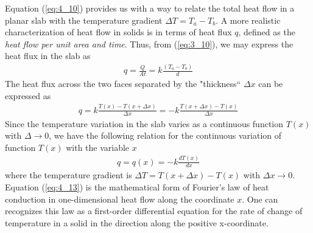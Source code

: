 \documentclass[11pt]{report}
\newcommand{\refn}[1]{(\ref{#1})}
\newcommand{\refx}[1]{\refn{eq:#1}}
\begin{document}
	Equation \refx{4_10} provides us with a way to relate the total heat flow in a planar slab with the temperature gradient $\Delta T = T_a - T_b$. A more realistic characterization of heat flow in solids is in terms of heat flux $q$, defined as the \textit{heat flow per unit area and time}. Thus, from \refx{3_10}, we may express the heat flux in the slab as
	\begin{eqnarray}
		q = \frac{Q}{At} = k\frac{(T_a - T_b)}{d}\label{eq:4_11}
	\end{eqnarray}
	The heat flux across the two faces separated by the "thickness`` $\Delta x $ can be expressed as
	\begin{eqnarray}
		q = k\frac{T(x) - T(x + \Delta x)}{\Delta x} = -k\frac{T(x+\Delta x) - T(x)}{\Delta x}\label{eq:4_12}
	\end{eqnarray}
	Since the temperature variation in the slab varies as a continuous function $T(x)$ with $\Delta\to 0$, we have the following relation for the continuous variation of function $T(x)$ with the variable $x$
	\begin{eqnarray}
		q = q(x) = -k\frac{dT(x)}{dx}\label{eq:4_13}
	\end{eqnarray}
	where the temperature gradient is $\Delta T = T(x+\Delta x) - T(x)$ with $\Delta x \to 0$. Equation \refx{4_13} is the mathematical form of Fourier's law of heat conduction in one-dimensional heat flow along the coordinate $x$. One can recognizes this law as a first-order differential equation for the rate of change of temperature in a solid in the direction along the positive x-coordinate.
	
\end{document}
